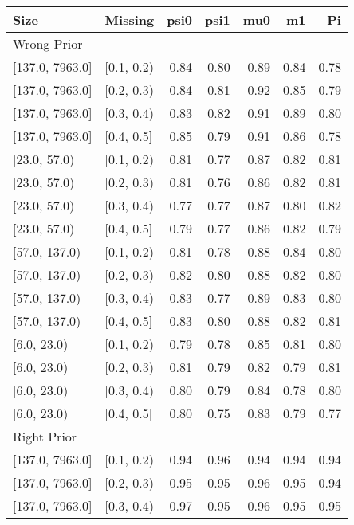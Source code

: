 \begin{table}[ht]
\centering
\begin{tabular}{llrrrrr}
  \toprule
Size & Missing & psi0 & psi1 & mu0 & m1 & Pi \\ 
  \midrule
\multicolumn{7}{l}{Wrong Prior}\\
{[137.0, 7963.0]} & {[0.1, 0.2)} & 0.84 & 0.80 & 0.89 & 0.84 & 0.78 \\ 
  {[137.0, 7963.0]} & {[0.2, 0.3)} & 0.84 & 0.81 & 0.92 & 0.85 & 0.79 \\ 
  {[137.0, 7963.0]} & {[0.3, 0.4)} & 0.83 & 0.82 & 0.91 & 0.89 & 0.80 \\ 
  {[137.0, 7963.0]} & {[0.4, 0.5]} & 0.85 & 0.79 & 0.91 & 0.86 & 0.78 \\ 
  {[23.0, 57.0)} & {[0.1, 0.2)} & 0.81 & 0.77 & 0.87 & 0.82 & 0.81 \\ 
  {[23.0, 57.0)} & {[0.2, 0.3)} & 0.81 & 0.76 & 0.86 & 0.82 & 0.81 \\ 
  {[23.0, 57.0)} & {[0.3, 0.4)} & 0.77 & 0.77 & 0.87 & 0.80 & 0.82 \\ 
  {[23.0, 57.0)} & {[0.4, 0.5]} & 0.79 & 0.77 & 0.86 & 0.82 & 0.79 \\ 
  {[57.0, 137.0)} & {[0.1, 0.2)} & 0.81 & 0.78 & 0.88 & 0.84 & 0.80 \\ 
  {[57.0, 137.0)} & {[0.2, 0.3)} & 0.82 & 0.80 & 0.88 & 0.82 & 0.80 \\ 
  {[57.0, 137.0)} & {[0.3, 0.4)} & 0.83 & 0.77 & 0.89 & 0.83 & 0.80 \\ 
  {[57.0, 137.0)} & {[0.4, 0.5]} & 0.83 & 0.80 & 0.88 & 0.82 & 0.81 \\ 
  {[6.0, 23.0)} & {[0.1, 0.2)} & 0.79 & 0.78 & 0.85 & 0.81 & 0.80 \\ 
  {[6.0, 23.0)} & {[0.2, 0.3)} & 0.81 & 0.79 & 0.82 & 0.79 & 0.81 \\ 
  {[6.0, 23.0)} & {[0.3, 0.4)} & 0.80 & 0.79 & 0.84 & 0.78 & 0.80 \\ 
  {[6.0, 23.0)} & {[0.4, 0.5]} & 0.80 & 0.75 & 0.83 & 0.79 & 0.77 \\ 
   \midrule
\multicolumn{7}{l}{Right Prior}\\
{[137.0, 7963.0]} & {[0.1, 0.2)} & 0.94 & 0.96 & 0.94 & 0.94 & 0.94 \\ 
  {[137.0, 7963.0]} & {[0.2, 0.3)} & 0.95 & 0.95 & 0.96 & 0.95 & 0.94 \\ 
  {[137.0, 7963.0]} & {[0.3, 0.4)} & 0.97 & 0.95 & 0.96 & 0.95 & 0.95 \\ 

\end{tabular}
\end{table}
